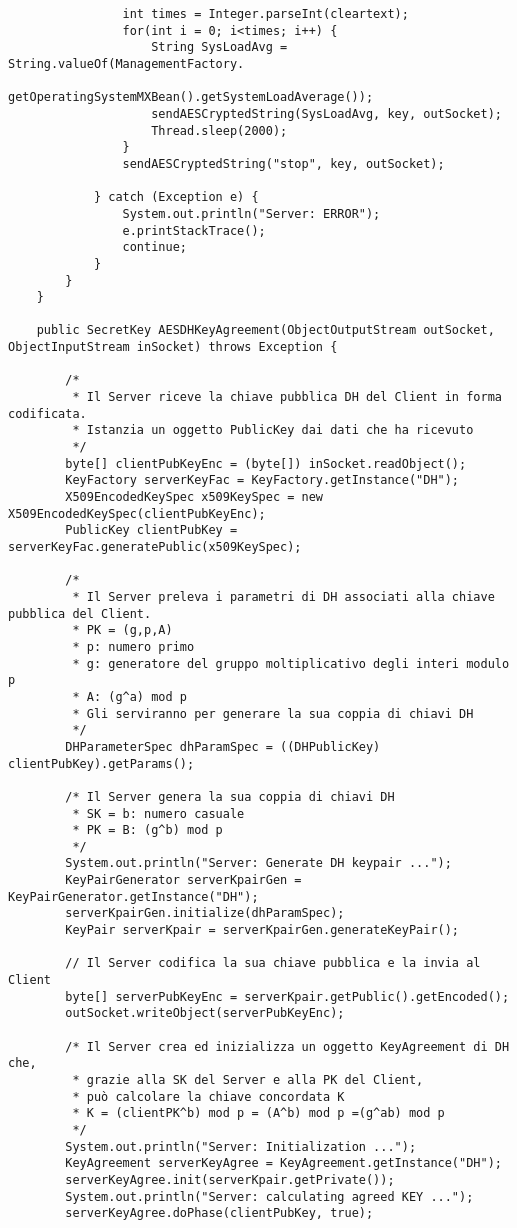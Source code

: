 \documentclass[12pt]{article}
\begin{document}
\begin{lstlisting}
				int times = Integer.parseInt(cleartext);
				for(int i = 0; i<times; i++) {
					String SysLoadAvg = String.valueOf(ManagementFactory.
					getOperatingSystemMXBean().getSystemLoadAverage());
					sendAESCryptedString(SysLoadAvg, key, outSocket);
					Thread.sleep(2000);
				}
				sendAESCryptedString("stop", key, outSocket);

			} catch (Exception e) {
				System.out.println("Server: ERROR");
				e.printStackTrace();
				continue;
			}
		}
	}

	public SecretKey AESDHKeyAgreement(ObjectOutputStream outSocket, ObjectInputStream inSocket) throws Exception {

		/*
		 * Il Server riceve la chiave pubblica DH del Client in forma codificata.
		 * Istanzia un oggetto PublicKey dai dati che ha ricevuto
		 */
		byte[] clientPubKeyEnc = (byte[]) inSocket.readObject();
		KeyFactory serverKeyFac = KeyFactory.getInstance("DH");
		X509EncodedKeySpec x509KeySpec = new X509EncodedKeySpec(clientPubKeyEnc);
		PublicKey clientPubKey = serverKeyFac.generatePublic(x509KeySpec);

		/*
		 * Il Server preleva i parametri di DH associati alla chiave pubblica del Client.
		 * PK = (g,p,A)
		 * p: numero primo
		 * g: generatore del gruppo moltiplicativo degli interi modulo p
		 * A: (g^a) mod p
		 * Gli serviranno per generare la sua coppia di chiavi DH
		 */
		DHParameterSpec dhParamSpec = ((DHPublicKey) clientPubKey).getParams();

		/* Il Server genera la sua coppia di chiavi DH
		 * SK = b: numero casuale
		 * PK = B: (g^b) mod p
		 */
		System.out.println("Server: Generate DH keypair ...");
		KeyPairGenerator serverKpairGen = KeyPairGenerator.getInstance("DH");
		serverKpairGen.initialize(dhParamSpec);
		KeyPair serverKpair = serverKpairGen.generateKeyPair();

		// Il Server codifica la sua chiave pubblica e la invia al Client
		byte[] serverPubKeyEnc = serverKpair.getPublic().getEncoded();
		outSocket.writeObject(serverPubKeyEnc);

		/* Il Server crea ed inizializza un oggetto KeyAgreement di DH che,
		 * grazie alla SK del Server e alla PK del Client,
		 * può calcolare la chiave concordata K
		 * K = (clientPK^b) mod p = (A^b) mod p =(g^ab) mod p
		 */
		System.out.println("Server: Initialization ...");
		KeyAgreement serverKeyAgree = KeyAgreement.getInstance("DH");
		serverKeyAgree.init(serverKpair.getPrivate());
		System.out.println("Server: calculating agreed KEY ...");
		serverKeyAgree.doPhase(clientPubKey, true);


\end{lstlisting}
\end{document}
